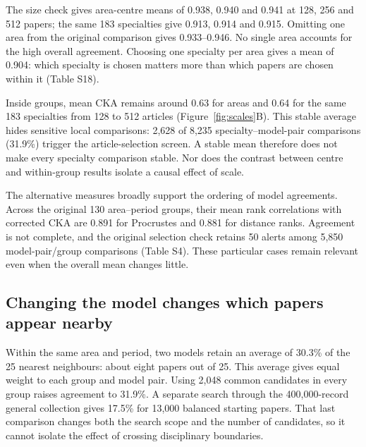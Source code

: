 \documentclass[12pt]{article}
\begin{document}
The size check gives area-centre means of 0.938, 0.940 and 0.941 at 128, 256 and 512 papers; the same 183 specialties give 0.913, 0.914 and 0.915. Omitting one area from the original comparison gives 0.933--0.946. No single area accounts for the high overall agreement. Choosing one specialty per area gives a mean of 0.904: which specialty is chosen matters more than which papers are chosen within it (Table S18).

Inside groups, mean CKA remains around 0.63 for areas and 0.64 for the same 183 specialties from 128 to 512 articles (Figure~\ref{fig:scales}B). This stable average hides sensitive local comparisons: 2,628 of 8,235 specialty--model-pair comparisons (31.9\%) trigger the article-selection screen. A stable mean therefore does not make every specialty comparison stable. Nor does the contrast between centre and within-group results isolate a causal effect of scale.

The alternative measures broadly support the ordering of model agreements. Across the original 130 area--period groups, their mean rank correlations with corrected CKA are 0.891 for Procrustes and 0.881 for distance ranks. Agreement is not complete, and the original selection check retains 50 alerts among 5,850 model-pair/group comparisons (Table S4). These particular cases remain relevant even when the overall mean changes little.

\FloatBarrier
\subsection{Changing the model changes which papers appear nearby}
Within the same area and period, two models retain an average of 30.3\% of the 25 nearest neighbours: about eight papers out of 25. This average gives equal weight to each group and model pair. Using 2,048 common candidates in every group raises agreement to 31.9\%. A separate search through the 400,000-record general collection gives 17.5\% for 13,000 balanced starting papers. That last comparison changes both the search scope and the number of candidates, so it cannot isolate the effect of crossing disciplinary boundaries.
\end{document}
